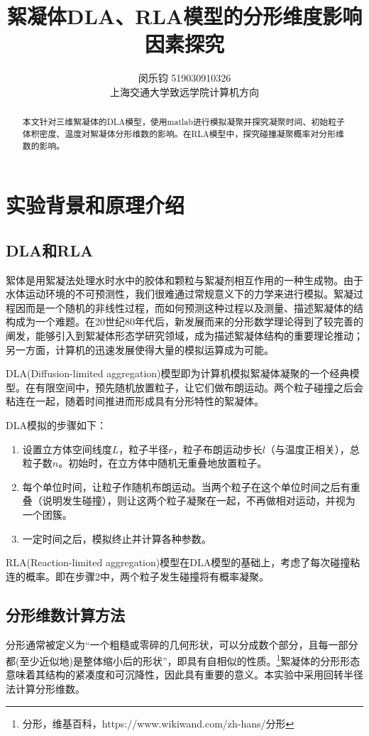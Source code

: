 \documentclass[lang=cn,11pt,a4paper,cite=authoryear]{elegantpaper}
\title{絮凝体DLA、RLA模型的分形维度影响因素探究}
\author{闵乐钧 519030910326\\ 上海交通大学致远学院计算机方向}
\date{\zhtoday}
\begin{document}
\maketitle

\begin{abstract}
本文针对三维絮凝体的DLA模型，使用matlab进行模拟凝聚并探究凝聚时间、初始粒子体积密度、温度对絮凝体分形维数的影响。在RLA模型中，探究碰撞凝聚概率对分形维数的影响。
\end{abstract}

\section{实验背景和原理介绍}

\subsection{DLA和RLA}
絮体是用絮凝法处理水时水中的胶体和颗粒与絮凝剂相互作用的一种生成物。由于水体运动环境的不可预测性，我们很难通过常规意义下的力学来进行模拟。絮凝过程因而是一个随机的非线性过程，而如何预测这种过程以及测量、描述絮凝体的结构成为一个难题。在20世纪80年代后，新发展而来的分形数学理论得到了较完善的阐发，能够引入到絮凝体形态学研究领域，成为描述絮凝体结构的重要理论推动；另一方面，计算机的迅速发展使得大量的模拟运算成为可能。

DLA(Diffusion-limited aggregation)模型即为计算机模拟絮凝体凝聚的一个经典模型。在有限空间中，预先随机放置粒子，让它们做布朗运动。两个粒子碰撞之后会粘连在一起，随着时间推进而形成具有分形特性的絮凝体。

DLA模拟的步骤如下：
\begin{enumerate}
    \item 设置立方体空间线度$L$，粒子半径$r$，粒子布朗运动步长$l$（与温度正相关），总粒子数$n$。初始时，在立方体中随机无重叠地放置粒子。
    \item 每个单位时间，让粒子作随机布朗运动。当两个粒子在这个单位时间之后有重叠（说明发生碰撞），则让这两个粒子凝聚在一起，不再做相对运动，并视为一个团簇。
    \item 一定时间之后，模拟终止并计算各种参数。
\end{enumerate}

RLA(Reaction-limited aggregation)模型在DLA模型的基础上，考虑了每次碰撞粘连的概率。即在步骤2中，两个粒子发生碰撞将有概率凝聚。

\subsection{分形维数计算方法}
分形通常被定义为“一个粗糙或零碎的几何形状，可以分成数个部分，且每一部分都(至少近似地)是整体缩小后的形状”，即具有自相似的性质。\footnote{分形，维基百科，https://www.wikiwand.com/zh-hans/分形}絮凝体的分形形态意味着其结构的紧凑度和可沉降性，因此具有重要的意义。本实验中采用回转半径法计算分形维数。
\end{document}
